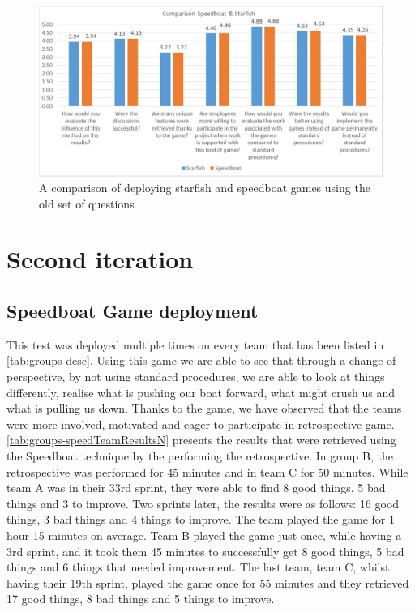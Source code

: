 \begin{figure}[!htbp]
\caption{A comparison of deploying starfish and speedboat games using the old set of questions}
\label{fig:comparedResultsOld}
\centering
\includegraphics[width=1\textwidth]{charts/comparisonOldSet}
\end{figure}

\section{Second iteration}
\label{sec:secondIt}
\subsection{Speedboat Game deployment}

This test was deployed multiple times on every team that has been listed in \autoref{tab:groups-desc}. Using this game we are able to see that through a change of perspective, by not using standard procedures, we are able to look at things differently, realise what is pushing our boat forward, what might crush us and what is pulling us down. Thanks to the game, we have observed that the teams were more involved, motivated and eager to participate in retrospective game. \autoref{tab:groups-speedTeamResultsN} presents the results that were retrieved using the Speedboat technique by the performing the retrospective. In group B, the retrospective was performed for 45 minutes and in team C for 50 minutes. While team A was in their 33rd sprint, they were able to find 8 good things, 5 bad things and 3 to improve. Two sprints later, the results were as follows: 16 good things, 3 bad things and 4 things to improve. The team played the game for 1 hour 15 minutes on average. Team B played the game just once, while having a 3rd sprint, and it took them 45 minutes to successfully get 8 good things, 5 bad things and 6 things that needed improvement. The last team, team C, whilst having their 19th sprint, played the game once for 55 minutes and they retrieved 17 good things, 8 bad things and 5 things to improve.


